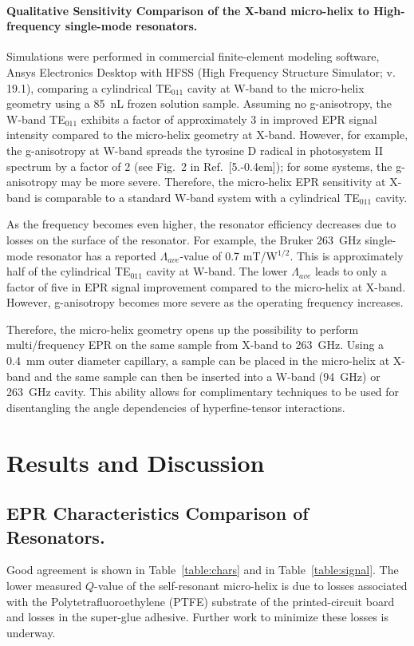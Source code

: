 \paragraph{Qualitative Sensitivity Comparison of the X-band micro-helix to High-frequency single-mode resonators.}
Simulations were performed in commercial finite-element modeling software, Ansys Electronics Desktop with HFSS (High Frequency Structure Simulator; v. 19.1), comparing a cylindrical TE$_{011}$ cavity at W-band to the micro-helix geometry using a 85~nL frozen solution sample. Assuming no g-anisotropy, the W-band TE$_{011}$ exhibits a factor of approximately 3 in improved EPR signal intensity compared to the micro-helix geometry at X-band. However, for example, the g-anisotropy at W-band spreads the tyrosine D radical in photosystem II spectrum by a factor of 2 (see Fig.~2 in Ref.~[5.\kern-0.4em]); for some systems, the g-anisotropy may be more severe. Therefore, the micro-helix EPR sensitivity at X-band is comparable to a standard W-band system with a cylindrical TE$_{011}$ cavity. 

As the frequency becomes even higher, the resonator efficiency decreases due to losses on the surface of the resonator. For example, the Bruker 263~GHz single-mode resonator has a reported $\Lambda_{ave}$-value of 0.7 mT/W$^{1/2}$. \cite{bruker263} This is approximately half of the cylindrical TE$_{011}$ cavity at W-band. The lower $\Lambda_{ave}$ leads to only a factor of five in EPR signal improvement compared to the micro-helix at X-band. However, g-anisotropy becomes more severe as the operating frequency increases.

Therefore, the micro-helix geometry opens up the possibility to perform multi\-/frequency EPR on the same sample from X-band to 263~GHz. Using a 0.4~mm outer diameter capillary, a sample can be placed in the micro-helix at X-band and the same sample can then be inserted into a W-band (94~GHz) or 263~GHz cavity. This ability allows for complimentary techniques to be used for disentangling the angle dependencies of hyperfine-tensor interactions.

\section{Results and Discussion}
\subsection{EPR Characteristics Comparison of Resonators.}
Good agreement is shown in Table~\ref{table:chars} and in Table~\ref{table:signal}. The lower measured $Q$-value of the self-resonant micro-helix is due to losses associated with the Polytetrafluoroethylene (PTFE) substrate of the printed-circuit board and losses in the super-glue adhesive. Further work to minimize these losses is underway.

